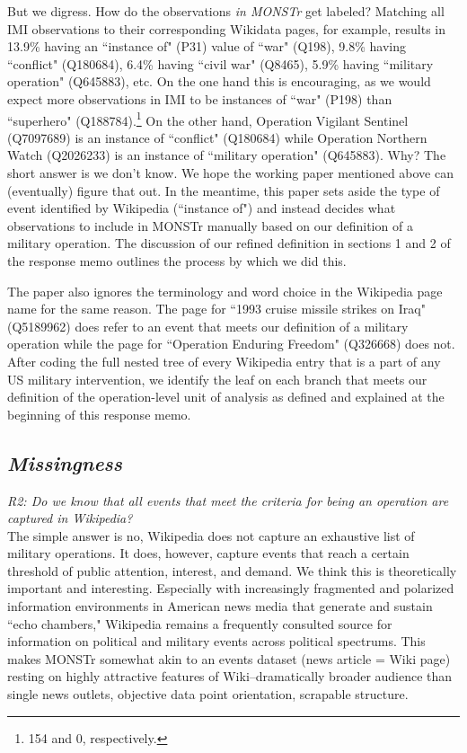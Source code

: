 \documentclass[fleqn,12pt]{article}
\begin{document}
But we digress. How do the observations \textit{in MONSTr} get labeled? Matching all IMI observations to their corresponding Wikidata pages, for example, results in 13.9\% having an ``instance of" (P31) value of ``war" (Q198), 9.8\% having ``conflict" (Q180684), 6.4\% having ``civil war" (Q8465), 5.9\% having ``military operation" (Q645883), etc. On the one hand this is encouraging, as we would expect more observations in IMI to be instances of ``war" (P198) than ``superhero" (Q188784).\footnote{154 and 0, respectively.} On the other hand, Operation Vigilant Sentinel (Q7097689) is an instance of ``conflict" (Q180684) while Operation Northern Watch (Q2026233) is an instance of ``military operation" (Q645883). Why? The short answer is we don't know. We hope the working paper mentioned above can (eventually) figure that out. In the meantime, this paper sets aside the type of event identified by Wikipedia (``instance of") and instead decides what observations to include in MONSTr manually based on our definition of a military operation. The discussion of our refined definition in sections 1 and 2 of the response memo outlines the process by which we did this.

The paper also ignores the terminology and word choice in the Wikipedia page name for the same reason. The page for ``1993 cruise missile strikes on Iraq" (Q5189962) does refer to an event that meets our definition of a military operation while the page for ``Operation Enduring Freedom" (Q326668) does not. After coding the full nested tree of every Wikipedia entry that is a part of any US military intervention, we identify the leaf on each branch that meets our definition of the operation-level unit of analysis as defined and explained at the beginning of this response memo.

\subsection*{\textit{Missingness}}
\textit{R2: Do we know that all events that meet the criteria for being an operation are captured in Wikipedia?} \\

The simple answer is no, Wikipedia does not capture an exhaustive list of military operations. It does, however, capture events that reach a certain threshold of public attention, interest, and demand. We think this is theoretically important and interesting. Especially with increasingly fragmented and polarized information environments in American news media that generate and sustain ``echo chambers," Wikipedia remains a frequently consulted source for information on political and military events across political spectrums. This makes MONSTr somewhat akin to an events dataset (news article = Wiki page) resting on highly attractive features of Wiki--dramatically broader audience than single news outlets, objective data point orientation, scrapable structure. \\
\end{document}
